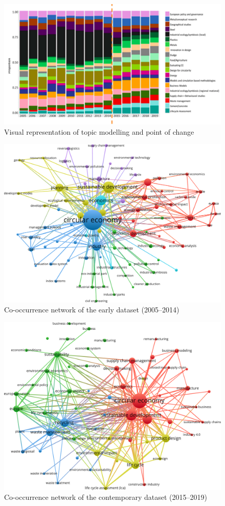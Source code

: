 \documentclass[output=paper]{langsci/langscibook}
\begin{document}
\begin{figure}[H]
\includegraphics[width=\textwidth]{figures/MAHANTY_Change detection.png}
\caption{Visual representation of topic modelling and point of change} \label{ch03:fig2}
\end{figure}\clearpage
\largerpage[2]
\vfill
\begin{figure}[H]
\includegraphics[width=.9\textwidth]{figures/MAHANTY_Co-occurrence1.pdf}
\caption{Co-occurrence network of the early dataset (2005--2014)}\label{ch03:fig3}
\end{figure}
\vfill
\begin{figure}[H]
\includegraphics[width=.9\textwidth]{figures/MAHANTY_Co-occurrence2.pdf}
\caption{Co-occurrence network of the contemporary dataset (2015--2019)}\label{ch03:fig4}
\end{figure}
\vfill\clearpage
\end{document}
